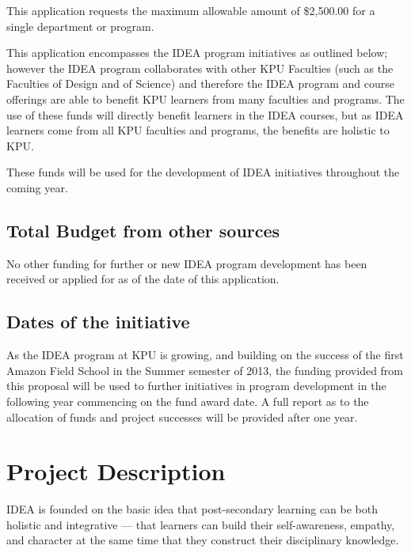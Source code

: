 \documentclass[11pt, letterpaper]{article}
\begin{document}
This application requests the maximum allowable amount of \$2,500.00 for
a single department or program.

This application encompasses the IDEA program initiatives as outlined
below; however the IDEA program collaborates with other KPU Faculties
(such as the Faculties of Design and of Science) and therefore the IDEA
program and course offerings are able to benefit KPU learners from many
faculties and programs. The use of these funds will directly benefit
learners in the IDEA courses, but as IDEA learners come from all KPU
faculties and programs, the benefits are holistic to KPU.

These funds will be used for the development of IDEA initiatives
throughout the coming year.

\subsection{Total Budget from other sources}

No other funding for further or new IDEA program development has been
received or applied for as of the date of this application.

\subsection{Dates of the initiative}

As the IDEA program at KPU is growing, and building on the success of
the first Amazon Field School in the Summer semester of 2013, the
funding provided from this proposal will be used to further initiatives
in program development in the following year commencing on the fund
award date. A full report as to the allocation of funds and project
successes will be provided after one year.

\section{Project Description}

IDEA is founded on the basic idea that post-secondary learning can be
both holistic and integrative --- that learners can build their
self-awareness, empathy, and character at the same time that they
construct their disciplinary knowledge.
\end{document}
